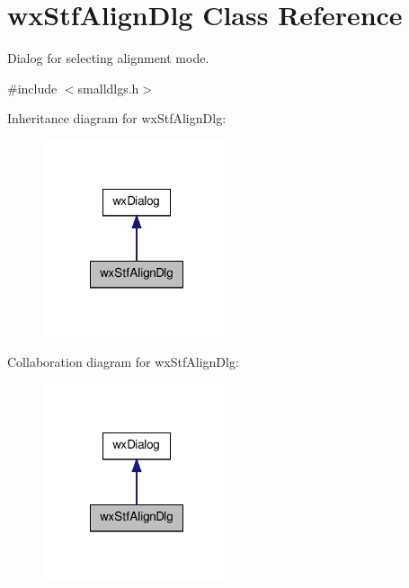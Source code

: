 \hypertarget{classwxStfAlignDlg}{
\section{wxStfAlignDlg Class Reference}
\label{classwxStfAlignDlg}
}


Dialog for selecting alignment mode.  




{\ttfamily \#include $<$smalldlgs.h$>$}



Inheritance diagram for wxStfAlignDlg:
\nopagebreak
\begin{figure}[H]
\begin{center}
\leavevmode
\includegraphics[width=156pt]{classwxStfAlignDlg__inherit__graph}
\end{center}
\end{figure}


Collaboration diagram for wxStfAlignDlg:
\nopagebreak
\begin{figure}[H]
\begin{center}
\leavevmode
\includegraphics[width=156pt]{classwxStfAlignDlg__coll__graph}
\end{center}
\end{figure}
